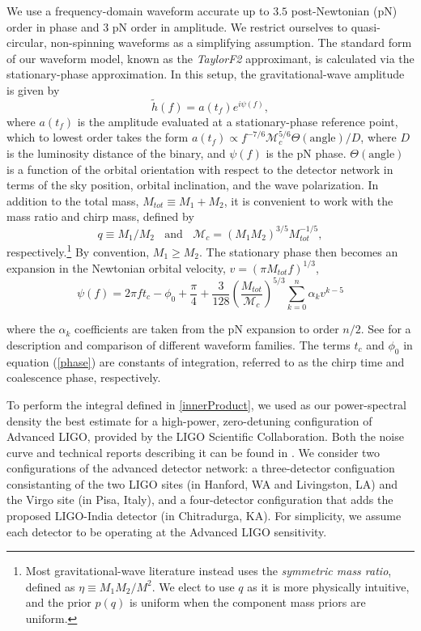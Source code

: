 \documentclass[11pt,a4paper]{emulateapj}
\newcommand{\chmass}{\mathcal{M}_c}
\begin{document}
We use a frequency-domain waveform accurate up to $3.5$
post-Newtonian (pN) order in phase and 3 pN order in amplitude.  We restrict ourselves to
quasi-circular, non-spinning waveforms as a simplifying assumption.  The standard
form of our waveform model, known as the \textit{TaylorF2}
approximant, is calculated via the stationary-phase approximation.
  In this setup, the gravitational-wave
amplitude is given by
\begin{equation}
\tilde{h}(f) = a(t_f) e^{i \psi(f)},
\label{amplitude}
\end{equation}
where $a(t_f)$ is the amplitude evaluated at a stationary-phase reference point, which to lowest order
takes the form $a(t_f) \propto f^{-7/6} \chmass^{5/6}\Theta(\text{angle})/D$, where $D$ is
the luminosity distance of the binary, and $\psi(f)$ is the pN phase.
$\Theta(\text{angle})$ is a function of the orbital orientation with
respect to the detector network in terms of the sky position, orbital
inclination, and the wave polarization.  In addition to the total
mass, $M_{tot}\equiv M_1+M_2$, it is convenient to work with the
mass ratio and chirp mass, defined by
\begin{equation}
  q\equiv M_1/M_2~~~~\text{and}~~~~\chmass = (M_1 M_2)^{3/5} M_{tot}^{-1/5},
  \label{eqRatioCM}
\end{equation}
respectively.\footnote{Most gravitational-wave literature instead uses the \textit{symmetric mass ratio}, defined as $\eta \equiv M_1 M_2 / M^2$.  We elect to use $q$ as it is more physically intuitive, and the prior $p(q)$ is uniform when the component
mass priors are uniform.}  By convention, $M_1 \geq M_2$.  The stationary phase then becomes an expansion in the 
Newtonian orbital velocity, $v=(\pi M_{tot} f)^{1/3}$, 
\begin{equation}
\psi(f) = 2 \pi f t_c - \phi_0 + \frac{\pi}{4} + \frac{3}{128}\left(\frac{M_{tot}}{\chmass}\right)^{5/3}\sum^{n}_{k=0}\alpha_{k}v^{k-5}
\label{phase}
\end{equation}

\noindent where the $\alpha_{k}$ coefficients are taken from the pN expansion to order $n/2$.  See \cite{BuonannoWaveform} for a description and comparison of different waveform families.  The terms $t_c$ and $\phi_0$ in equation (\ref{phase}) are constants of integration, referred to as the chirp time and coalescence phase, respectively. 

To perform the integral defined in \eqref{innerProduct}, we used as our power-spectral
density the best estimate for a high-power, zero-detuning configuration of Advanced 
LIGO, provided by the LIGO Scientific Collaboration.  Both the noise curve and technical 
reports describing it can be found in \cite{ADVLIGONoise}.
We consider two configurations of the advanced detector
network: a three-detector configuation consistanting of the two LIGO sites 
(in Hanford, WA and Livingston, LA) and the Virgo site (in Pisa, Italy), and a 
four-detector configuration that adds the proposed LIGO-India detector
(in Chitradurga, KA).  For simplicity, we assume each detector to be 
operating at the Advanced LIGO sensitivity. 
\end{document}
